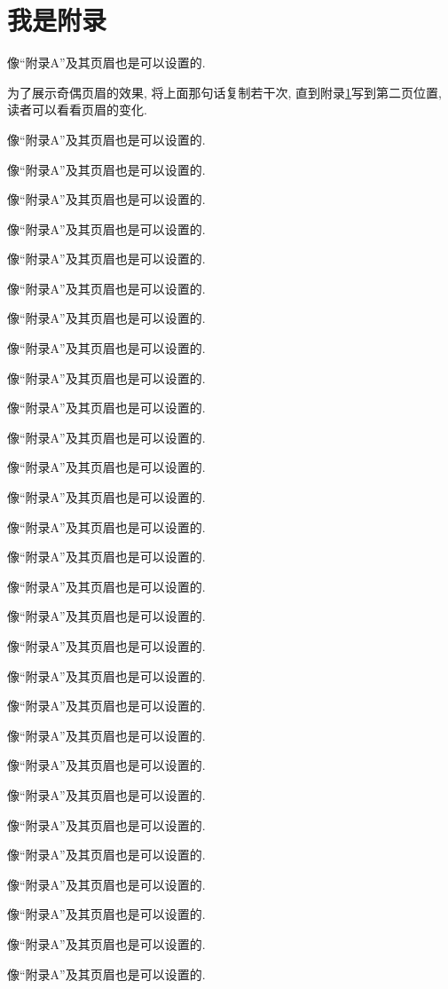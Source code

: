\documentclass{scutbthesis}
\begin{document}
\section{我是附录}
\label{sec:A}
像``附录A''及其页眉也是可以设置的.

为了展示奇偶页眉的效果, 将上面那句话复制若干次, 直到附录\ref{sec:A}写到第二页位置, 读者可以看看页眉的变化.

像``附录A''及其页眉也是可以设置的.

像``附录A''及其页眉也是可以设置的.

像``附录A''及其页眉也是可以设置的.

像``附录A''及其页眉也是可以设置的.

像``附录A''及其页眉也是可以设置的.

像``附录A''及其页眉也是可以设置的.

像``附录A''及其页眉也是可以设置的.

像``附录A''及其页眉也是可以设置的.

像``附录A''及其页眉也是可以设置的.

像``附录A''及其页眉也是可以设置的.

像``附录A''及其页眉也是可以设置的.

像``附录A''及其页眉也是可以设置的.

像``附录A''及其页眉也是可以设置的.

像``附录A''及其页眉也是可以设置的.

像``附录A''及其页眉也是可以设置的.

像``附录A''及其页眉也是可以设置的.

像``附录A''及其页眉也是可以设置的.

像``附录A''及其页眉也是可以设置的.

像``附录A''及其页眉也是可以设置的.

像``附录A''及其页眉也是可以设置的.

像``附录A''及其页眉也是可以设置的.

像``附录A''及其页眉也是可以设置的.

像``附录A''及其页眉也是可以设置的.

像``附录A''及其页眉也是可以设置的.

像``附录A''及其页眉也是可以设置的.

像``附录A''及其页眉也是可以设置的.

像``附录A''及其页眉也是可以设置的.

像``附录A''及其页眉也是可以设置的.

像``附录A''及其页眉也是可以设置的.
\end{document}
